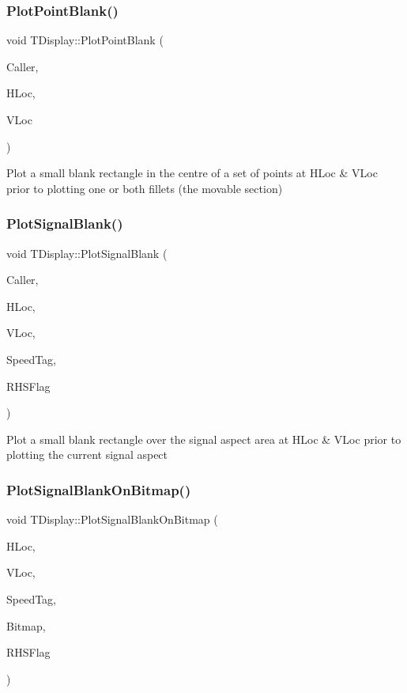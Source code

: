 \subsubsection{\texorpdfstring{Plot\+Point\+Blank()}{PlotPointBlank()}}
{\footnotesize\ttfamily void T\+Display\+::\+Plot\+Point\+Blank (\begin{DoxyParamCaption}\item[{int}]{Caller,  }\item[{int}]{H\+Loc,  }\item[{int}]{V\+Loc }\end{DoxyParamCaption})}

Plot a small blank rectangle in the centre of a set of points at H\+Loc \& V\+Loc prior to plotting one or both fillets (the movable section) \mbox{\label{class_t_display_a6e970089a9419e6bdd12576b6e860c95}} 
\subsubsection{\texorpdfstring{Plot\+Signal\+Blank()}{PlotSignalBlank()}}
{\footnotesize\ttfamily void T\+Display\+::\+Plot\+Signal\+Blank (\begin{DoxyParamCaption}\item[{int}]{Caller,  }\item[{int}]{H\+Loc,  }\item[{int}]{V\+Loc,  }\item[{int}]{Speed\+Tag,  }\item[{bool}]{R\+H\+S\+Flag }\end{DoxyParamCaption})}

Plot a small blank rectangle over the signal aspect area at H\+Loc \& V\+Loc prior to plotting the current signal aspect \mbox{\label{class_t_display_abb140097c975da97aa53bc3946f3ea31}} 
\subsubsection{\texorpdfstring{Plot\+Signal\+Blank\+On\+Bitmap()}{PlotSignalBlankOnBitmap()}}
{\footnotesize\ttfamily void T\+Display\+::\+Plot\+Signal\+Blank\+On\+Bitmap (\begin{DoxyParamCaption}\item[{int}]{H\+Loc,  }\item[{int}]{V\+Loc,  }\item[{int}]{Speed\+Tag,  }\item[{Graphics\+::\+T\+Bitmap $\ast$}]{Bitmap,  }\item[{bool}]{R\+H\+S\+Flag }\end{DoxyParamCaption})}

